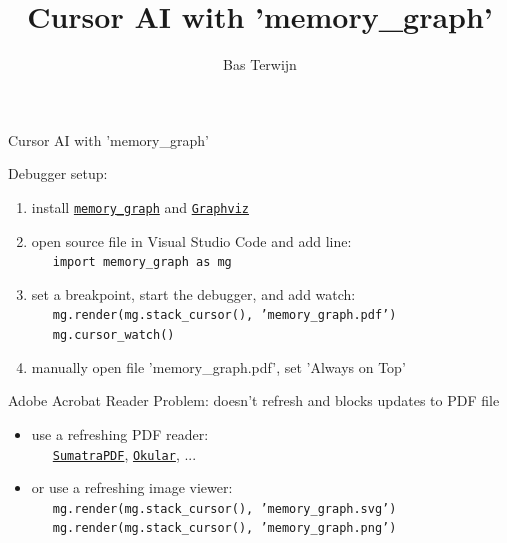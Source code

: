\documentclass[10pt, colorlinks=true, urlcolor=blue]{beamer}
\title{Cursor AI with 'memory\_graph'}
\author{Bas Terwijn}
\date{}
\begin{document}
\begin{frame}
    \titlepage
\end{frame}

\begin{frame}{Cursor AI with 'memory\_graph'}

  Debugger setup:
  \begin{enumerate}
  \item install \href{https://pypi.org/project/memory-graph/}{\texttt{memory\_graph}} and \href{https://graphviz.org/download/}{\texttt{Graphviz}}
  \item open source file in Visual Studio Code and add line: \\
    \ \ \ {\footnotesize \texttt{import memory_graph as mg}}
  \item set a breakpoint, start the debugger, and add watch: \\
    \ \ \ {\footnotesize \texttt{mg.render(mg.stack_cursor(), 'memory_graph.pdf')}} \\
    \ \ \ {\footnotesize \texttt{mg.cursor_watch()}}
  \item manually open file 'memory\_graph.pdf',  set 'Always on Top'
  \end{enumerate}
  
  \vspace{1.8em}
  
  Adobe Acrobat Reader Problem: doesn't refresh and blocks updates to PDF file
  \begin{itemize}
  \item use a refreshing PDF reader: \\ \ \ \
    \href{https://www.sumatrapdfreader.org/}{\texttt{SumatraPDF}},
    \href{https://okular.kde.org/}{\texttt{Okular}}, ...
  \item or use a refreshing image viewer: \\
\ \ \ {\footnotesize \texttt{mg.render(mg.stack_cursor(), 'memory_graph.svg')}} \\
\ \ \ {\footnotesize \texttt{mg.render(mg.stack_cursor(), 'memory_graph.png')}}
  \end{itemize}
\end{frame}
\end{document}

